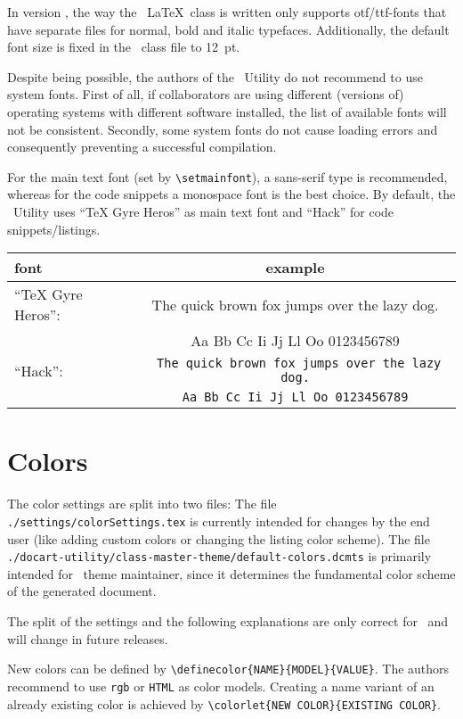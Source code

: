 		\begin{daWarningBox}
			In version \productVersion, the way the \productName~\LaTeX~class is written only supports otf/ttf-fonts that have separate files for normal, bold and italic typefaces. Additionally, the default font size is fixed in the \productName~class file to \mbox{12 pt}. 
		\end{daWarningBox}
	
		\begin{daInfoBox}
			Despite being possible, the authors of the \productName~Utility do not recommend to use system fonts. First of all, if collaborators are using different (versions of) operating systems with different software installed, the list of available fonts will not be consistent. Secondly, some system fonts do not cause loading errors and consequently preventing a successful compilation.
		\end{daInfoBox}
		For the main text font (set by \lstinline$\setmainfont$), a sans-serif type is recommended, whereas for the code snippets a monospace font is the best choice. By default, the \productName~Utility uses \enquote{TeX Gyre Heros} as main text font and \enquote{Hack} for code snippets/listings.
	
		\begin{longtable}[c]{lc}
			\textbf{font} & \textbf{example}\\
			\midrule
			\endfirsthead
			\rowcolor{tableRowHighlightColor}
			\enquote{TeX Gyre Heros}: & The quick brown fox jumps over the lazy dog.\\
			& Aa Bb Cc Ii Jj Ll Oo 0123456789 \\
			\enquote{Hack}: & \lstinline$ The quick brown fox jumps over the lazy dog.$\\
			\rowcolor{white}
			& \lstinline$Aa Bb Cc Ii Jj Ll Oo 0123456789$\\
			\midrule
		\end{longtable}
		
	\newpage
	\section{Colors}
		The color settings are split into two files: The file \lstinline$./settings/colorSettings.tex$ is currently intended for changes by the end user (like adding custom colors or changing the listing color scheme). The file \lstinline$./docart-utility/class-master-theme/default-colors.dcmts$ is primarily intended for \productName~theme maintainer, since it determines the fundamental color scheme of the generated document.
		\begin{daWarningBox}
			The split of the settings and the following explanations are only correct for \productVersion~and will change in future releases.
		\end{daWarningBox}
		New colors can be defined by \lstinline$\definecolor{NAME}{MODEL}{VALUE}$.
		The authors recommend to use \lstinline$rgb$ or \lstinline$HTML$ as color models. Creating a name variant of an already existing color is achieved by \lstinline$\colorlet{NEW COLOR}{EXISTING COLOR}$.
		
